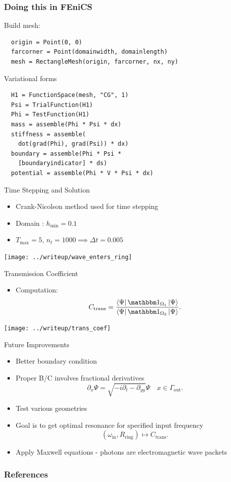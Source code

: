 \documentclass{beamer}
\begin{document}
\begin{frame}[fragile]
\frametitle{Doing this in FEniCS}

Build mesh:
\begin{lstlisting}
  origin = Point(0, 0)
  farcorner = Point(domainwidth, domainlength)
  mesh = RectangleMesh(origin, farcorner, nx, ny)
\end{lstlisting} 

Variational forms

\begin{lstlisting}
  H1 = FunctionSpace(mesh, "CG", 1)
  Psi = TrialFunction(H1)
  Phi = TestFunction(H1)
  mass = assemble(Phi * Psi * dx)
  stiffness = assemble(
    dot(grad(Phi), grad(Psi)) * dx)
  boundary = assemble(Phi * Psi * 
    [boundaryindicator] * ds)
  potential = assemble(Phi * V * Psi * dx)

\end{lstlisting}
\end{frame}

\begin{frame}{Time Stepping and Solution}
\begin{itemize}
		\item Crank-Nicolson method used for time stepping
		\item Domain : $h_\mathrm{min} = 0.1$
		\item $T_\mathrm{max} = 5$, $n_t = 1000 \implies 
				\Delta t = 0.005$
\end{itemize}

\centering
\texttt{[image: ../writeup/wave\_enters\_ring]}

\end{frame}

\begin{frame}{Transmission Coefficient}
\begin{itemize}
		\item Computation: 
				\[
						C_\mathrm{trans} = 
						\frac{\bra{\Psi} \mathbbm 1_{\Omega_1} \ket{\Psi}}
						{\bra{\Psi} \mathbbm 1_{\Omega_2} \ket{\Psi}}
				.\] 

\end{itemize}

\centering
\texttt{[image: ../writeup/trans\_coef]}
  
\end{frame}

\begin{frame}{Future Improvements}
\begin{itemize}
		\item Better boundary condition
		\item Proper B/C involves fractional derivatives
				\[
						\partial_x \Psi = \sqrt{-i \partial_t - \partial_{yy}} \Psi 
						\quad x \in \Gamma_\mathrm{out}
				.\] 
		\item Test various geometries
		\item Goal is to get optimal resonance for specified input frequency
				\[
						(\omega_\mathrm{in}, R_\mathrm{ring}) \mapsto C_\mathrm{trans}
				.\]
		\item Apply Maxwell equations - photons are electromagnetic wave packets
\end{itemize}  
\end{frame}

\begin{frame}[allowframebreaks]
		\frametitle{References}
		
		
		\nocite{*}
\end{frame}
\end{document}
